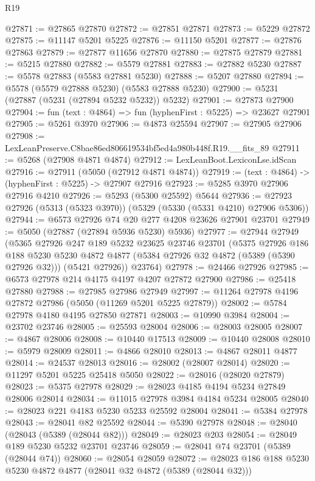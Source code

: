 \begin{lexlean}{R19}
\begin{coremodule}
@27871 := @27865 @27870
@27872 := @27851 @27871
@27873 := @5229 @27872
@27875 := @11147 @5201 @5225
@27876 := @11150 @5201
@27877 := @27876 @27863
@27879 := @27877 @11656 @27870
@27880 := @27875 @27879
@27881 := @5215 @27880
@27882 := @5579 @27881
@27883 := @27882 @5230
@27887 := @5578 @27883 (@5583 @27881 @5230)
@27888 := @5207 @27880
@27894 := @5578 (@5579 @27888 @5230) (@5583 @27888 @5230)
@27900 := @5231 (@27887 (@5231 (@27894 @5232 @5232)) @5232)
@27901 := @27873 @27900
@27904 := fun (text : @4864) => fun (hyphenFirst : @5225) => @23627 @27901
@27905 := @5261 @3970
@27906 := @4873 @25594
@27907 := @27905 @27906
@27908 := LexLeanPreserve.C8bae86ed806619534bf5ed4a980b448f.R19.__fits_89
@27911 := @5268 (@27908 @4871 @4874)
@27912 := LexLeanBoot.LexiconLse.idScan
@27916 := @27911 (@5050 (@27912 @4871 @4874))
@27919 := (text : @4864) -> (hyphenFirst : @5225) -> @27907 @27916
@27923 := @5285 @3970 @27906 @27916 @4210
@27926 := @5293 (@5300 @25592) @5644
@27936 := @27923 @27926 (@5313 (@5323 @3970)) (@5329 (@5330 (@5331 @4210) @27906 @5306))
@27944 := @6573 @27926 @74 @20 @277 @4208 @23626 @27901 @23701
@27949 := @5050 (@27887 (@27894 @5936 @5230) @5936)
@27977 := @27944
    @27949
    (@5365
      @27926
      @247
      @189
      @5232
      @23625
      @23746
      @23701
      (@5375
        @27926
        @186
        @188
        @5230
        @5230
        @4872
        @4877
        (@5384 @27926 @32 @4872 (@5389 (@5390 @27926 @32)))
        (@5421 @27926))
      @23764)
@27978 := @24466 @27926
@27985 := @6573 @27978 @214 @4175 @4197 @4207 @27872 @27900
@27986 := @25418 @27880
@27988 := @27985 @27986 @27949
@27997 := @11264 @27978 @4196 @27872 @27986 (@5050 (@11269 @5201 @5225 @27879))
@28002 := @5784 @27978 @4180 @4195 @27850 @27871
@28003 := @10990 @3984
@28004 := @23702 @23746
@28005 := @25593 @28004
@28006 := @28003 @28005
@28007 := @4867 @28006
@28008 := @10440 @17513
@28009 := @10440 @28008
@28010 := @5979 @28009
@28011 := @4866 @28010
@28013 := @4867 @28011 @4877
@28014 := @24537 @28013
@28016 := @28002 (@28007 @28014)
@28020 := @11297 @5201 @5225 @25418 @5050
@28022 := @28016 (@28020 @27879)
@28023 := @5375 @27978
@28029 := @28023 @4185 @4194 @5234 @27849 @28006 @28014
@28034 := @11015 @27978 @3984 @4184 @5234 @28005
@28040 := @28023 @221 @4183 @5230 @5233 @25592 @28004
@28041 := @5384 @27978
@28043 := @28041 @82 @25592
@28044 := @5390 @27978
@28048 := @28040 (@28043 (@5389 (@28044 @82)))
@28049 := @28023 @203
@28054 := @28049 @189 @5230 @5232 @23701 @23746
@28059 := @28041 @74 @23701 (@5389 (@28044 @74))
@28060 := @28054 @28059
@28072 := @28023 @186 @188 @5230 @5230 @4872 @4877 (@28041 @32 @4872 (@5389 (@28044 @32)))

\end{coremodule}
\end{lexlean}
